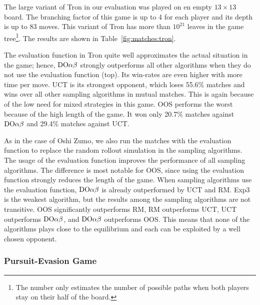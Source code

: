 The large variant of Tron in our evaluation was played on en empty $13\times 13$ board. The branching factor of this game is up to 4 for each player and its depth is up to 83 moves. This variant of Tron has more than $10^{21}$ leaves in the game tree\footnote{The number only estimates the number of possible paths when both players stay on their half of the board.}.
The results are shown in Table~\ref{fig:matches:tron}.

The evaluation function in Tron quite well approximates the actual situation in the game; hence, $\textrm{DO}\alpha\beta$ strongly outperforms all other algorithms when they do not use the evaluation function (top). Its win-rates are even higher with more time per move. 
UCT is its strongest opponent, which loses 55.6\% matches and wins over all other sampling algorithms in mutual matches. This is again because of the low need for mixed strategies in this game.
OOS performs the worst because of the high length of the game. It won only 20.7\% matches against $\textrm{DO}\alpha\beta$ and 29.4\% matches against UCT. 

As in the case of Oshi Zumo, we also run the matches with the evaluation function to replace the random rollout simulation in the sampling algorithms. 
The usage of the evaluation function improves the performance of all sampling algorithms.
The difference is most notable for OOS, since using the evaluation function strongly reduces the length of the game.
When sampling algorithms use the evaluation function, $\textrm{DO}\alpha\beta$ is already outperformed by UCT and RM.
Exp3 is the weakest algorithm, but the results among the sampling algorithms are not transitive.
OOS significantly outperforms RM, RM outperforms UCT, UCT outperforms $\textrm{DO}\alpha\beta$, and $\textrm{DO}\alpha\beta$ outperforms OOS. This means that none of the algorithms plays close to the equilibrium and each can be exploited by a well chosen opponent.

\subsubsection{Pursuit-Evasion Game}

